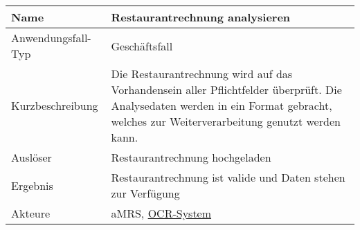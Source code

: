 \begin{table}[H]
    \centering
    \label{}
    \begin{tabularx}{\textwidth}{| l | X |}
        \hline
        Name               & Restaurantrechnung analysieren                                                                                                                                                       \\
        \hline
        Anwendungsfall-Typ & Geschäftsfall                                                                                                                                                                        \\
        \hline
        Kurzbeschreibung   & Die Restaurantrechnung wird auf das Vorhandensein aller Pflichtfelder überprüft. Die Analysedaten werden in ein Format gebracht, welches zur Weiterverarbeitung genutzt werden kann. \\
        \hline
        Auslöser           & Restaurantrechnung hochgeladen                                                                                                                                                       \\
        \hline
        Ergebnis           & Restaurantrechnung ist valide und Daten stehen zur Verfügung                                                                                                                         \\
        \hline
        Akteure            & \ac{aMRS}, \hyperref[gls:ocr-System]{OCR-System}                                                                                                                                                                \\
        \hline
    \end{tabularx}
\end{table}


